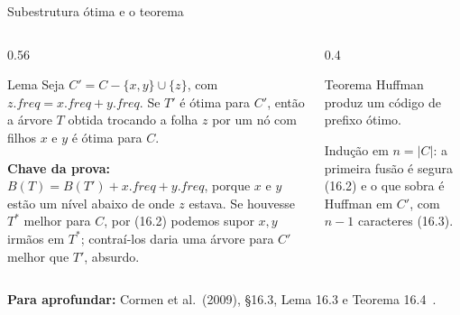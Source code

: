 \documentclass[aspectratio=169,xcolor=table]{beamer}
\newcommand{\fonte}[1]{%
  \vfill
  {\tiny\color{gray!55!black}\textbf{Para aprofundar:} #1\par}%
}
\begin{document}
\begin{frame}{Subestrutura ótima e o teorema}
  \begin{columns}[T]
    \begin{column}{0.56\textwidth}
      \begin{block}{Lema}
        \scriptsize Seja $C' = C - \{x, y\} \cup \{z\}$, com
        $z.\mathit{freq} = x.\mathit{freq} + y.\mathit{freq}$. Se $T'$ é ótima para $C'$,
        então a árvore $T$ obtida trocando a folha $z$ por um nó com filhos $x$ e $y$ é
        ótima para $C$.
      \end{block}
      \scriptsize
      \textbf{Chave da prova:} $B(T) = B(T') + x.\mathit{freq} + y.\mathit{freq}$, porque $x$ e
      $y$ estão um nível abaixo de onde $z$ estava. Se houvesse $T^\ast$ melhor para $C$,
      por (16.2) podemos supor $x, y$ irmãos em $T^\ast$; contraí-los daria uma árvore para
      $C'$ melhor que $T'$, absurdo.
    \end{column}
    \begin{column}{0.4\textwidth}
      \begin{center}
      \end{center}
      \begin{block}{Teorema}
        \scriptsize Huffman produz um código de prefixo ótimo.
      \end{block}
      \scriptsize Indução em $n = |C|$: a primeira fusão é segura (16.2) e o que sobra é
      Huffman em $C'$, com $n - 1$ caracteres (16.3).
    \end{column}
  \end{columns}
  \fonte{Cormen et al.\ (2009), \S 16.3, Lema 16.3 e Teorema 16.4~\cite{cormen2009introduction}.}
\end{frame}
\end{document}
